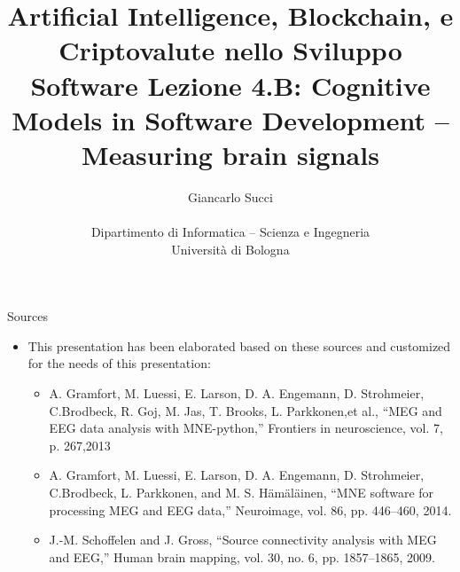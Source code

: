 \documentclass{beamer}
\title[L04]{Artificial Intelligence, Blockchain, e Criptovalute nello Sviluppo Software \newline\newline
Lezione 4.B: Cognitive Models in Software Development -- Measuring brain signals} %
\author[{\tiny Giancarlo Succi }]{Giancarlo Succi\\\\ Dipartimento di Informatica -- Scienza e Ingegneria\\Universit\`{a} di Bologna\\
\bftt{g.succi@unibo.it}
} %
\institute[unibo] %
\date{} %
\begin{document}
\begin{frame}
\titlepage %

\end{frame}





\begin{frame}
{\centerline{Sources}}
\begin{itemize}
    \item This presentation has been elaborated  based on these sources and customized for the needs of this presentation:
    \begin{itemize}
        \item  A. Gramfort, M. Luessi, E. Larson, D. A. Engemann, D. Strohmeier, C.Brodbeck, R. Goj, M. Jas, T. Brooks, L. Parkkonen,et al., ``MEG and EEG data analysis with MNE-python,'' Frontiers in neuroscience, vol. 7, p. 267,2013
        \item A. Gramfort, M. Luessi, E. Larson, D. A. Engemann, D. Strohmeier, C.Brodbeck, L. Parkkonen, and M. S. H\"{a}m\"{a}l\"{a}inen, ``MNE software for processing MEG and EEG data,'' Neuroimage, vol. 86, pp. 446–460, 2014.
        \item J.-M. Schoffelen and J. Gross, ``Source connectivity analysis with MEG and EEG,'' Human brain mapping, vol. 30, no. 6, pp. 1857–1865, 2009.
    \end{itemize}
\end{itemize}
\end{frame}
\end{document}
